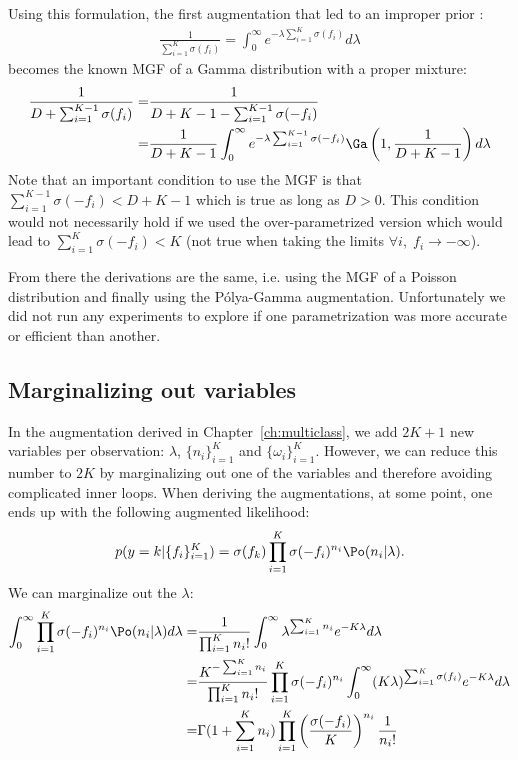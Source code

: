 Using this formulation, the first augmentation that led to an improper prior :
\begin{align*}
    \frac{1}{ \sum_{i=1}^{K} \sigma(f_i)} = \int_0^\infty e^{-\lambda  \sum_{i=1}^{K} \sigma(f_i)}d\lambda
\end{align*}
becomes the known \ac{MGF} of a Gamma distribution with a proper mixture:
\begin{align*}
    \frac{1}{D + \sum_{i=1}^{K-1} \sigma(f_i)} =& \frac{1}{D + K - 1 - \sum_{i=1}^{K-1} \sigma(-f_i)}\\
    =& \frac{1}{D + K - 1}\int_0^\infty e^{-\lambda \sum_{i=1}^{K-1} \sigma(-f_i)}\Ga \left(1, \frac{1}{D + K - 1}\right)d\lambda
\end{align*}
Note that an important condition to use the \ac{MGF} is that $\sum_{i=1}^{K-1} \sigma(-f_i) < D + K - 1$ which is true as long as $D > 0$.
This condition would not necessarily hold if we used the over-parametrized version which would lead to $\sum_{i=1}^{K} \sigma(-f_i) < K$ (not true when taking the limits $\forall i,\;f_i \rightarrow -\infty$).

From there the derivations are the same, i.e. using the \ac{MGF} of a Poisson distribution and finally using the P\'olya-Gamma augmentation.
Unfortunately we did not run any experiments to explore if one parametrization was more accurate or efficient than another.

\subsection{Marginalizing out variables}
In the augmentation derived in Chapter~\ref{ch:multiclass}, we add $2K + 1$ new variables per observation: $\lambda$, $\{n_i\}_{i=1}^K$ and $\{\omega_i\}_{i=1}^K$.
However, we can reduce this number to $2K$ by marginalizing out one of the variables and therefore avoiding complicated inner loops.
When deriving the augmentations, at some point, one ends up with the following augmented likelihood:
\begin{align}
    p(y=k|\{f_i\}_{i=1}^K) = \sigma(f_k) \prod_{i=1}^K \sigma(-f_i)^{n_i} \Po (n_i|\lambda).
\end{align}
We can marginalize out the $\lambda$:
\begin{align}
    \int_{0}^\infty \prod_{i=1}^K \sigma(-f_i)^{n_i} \Po (n_i|\lambda)d\lambda =& \frac{1}{\prod_{i=1}^K n_i!}\int_{0}^\infty \lambda^{\sum_{i=1}^K n_i}e^{-K\lambda}d\lambda \nonumber\\
    =& \frac{K^{-\sum_{i=1}^K n_i}}{\prod_{i=1}^K n_i!}\prod_{i=1}^K \sigma(-f_i)^{n_i} \int_{0}^\infty (K\lambda)^{\sum_{i=1}^K \sigma(f_i)}e^{-K\lambda}d\lambda \nonumber\\
    =& \Gamma(1 + \sum_{i=1}^K n_i) \prod_{i=1}^K \left(\frac{\sigma(-f_i)}{K}\right)^{n_i}\frac{1}{n_i!} \label{eq:NM}
\end{align}

